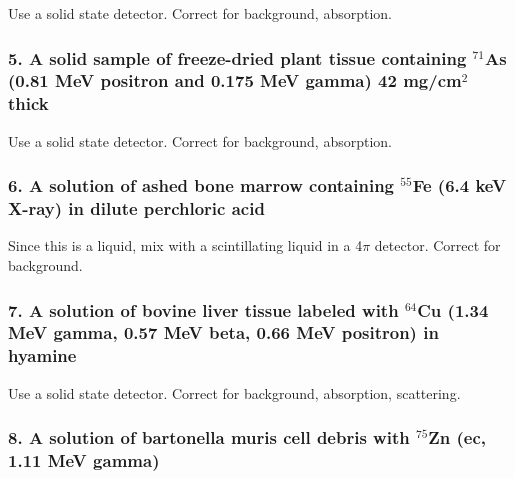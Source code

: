 \documentclass[11pt]{article}
\begin{document}
    Use a solid state detector. Correct for background, absorption.

    \subsubsection{\texorpdfstring{5. A solid sample of freeze-dried plant
tissue containing \(^{71}\)As (0.81 MeV positron and 0.175 MeV gamma) 42
mg/cm\(^2\)
thick}{5. A solid sample of freeze-dried plant tissue containing \^{}\{71\}As (0.81 MeV positron and 0.175 MeV gamma) 42 mg/cm\^{}2 thick}}\label{a-solid-sample-of-freeze-dried-plant-tissue-containing-71as-0.81-mev-positron-and-0.175-mev-gamma-42-mgcm2-thick}

    Use a solid state detector. Correct for background, absorption.

    \subsubsection{\texorpdfstring{6. A solution of ashed bone marrow
containing \(^{55}\)Fe (6.4 keV X-ray) in dilute perchloric
acid}{6. A solution of ashed bone marrow containing \^{}\{55\}Fe (6.4 keV X-ray) in dilute perchloric acid}}\label{a-solution-of-ashed-bone-marrow-containing-55fe-6.4-kev-x-ray-in-dilute-perchloric-acid}

    Since this is a liquid, mix with a scintillating liquid in a 4\(\pi\)
detector. Correct for background.

    \subsubsection{\texorpdfstring{7. A solution of bovine liver tissue
labeled with \(^{64}\)Cu (1.34 MeV gamma, 0.57 MeV beta, 0.66 MeV
positron) in
hyamine}{7. A solution of bovine liver tissue labeled with \^{}\{64\}Cu (1.34 MeV gamma, 0.57 MeV beta, 0.66 MeV positron) in hyamine}}\label{a-solution-of-bovine-liver-tissue-labeled-with-64cu-1.34-mev-gamma-0.57-mev-beta-0.66-mev-positron-in-hyamine}

    Use a solid state detector. Correct for background, absorption,
scattering.

    \subsubsection{\texorpdfstring{8. A solution of bartonella muris cell
debris with \(^{75}\)Zn (ec, 1.11 MeV
gamma)}{8. A solution of bartonella muris cell debris with \^{}\{75\}Zn (ec, 1.11 MeV gamma)}}\label{a-solution-of-bartonella-muris-cell-debris-with-75zn-ec-1.11-mev-gamma}
\end{document}
